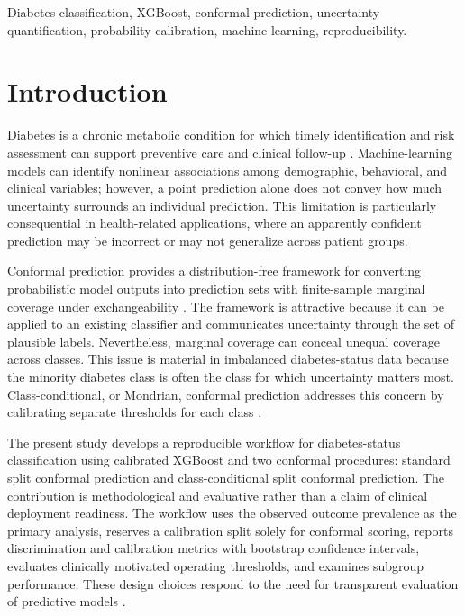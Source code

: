 \documentclass{ieeeaccess}
\begin{document}
\begin{keywords}
Diabetes classification, XGBoost, conformal prediction, uncertainty quantification, probability calibration, machine learning, reproducibility.
\end{keywords}

\titlepgskip=-15pt

\maketitle

\section{Introduction}
Diabetes is a chronic metabolic condition for which timely identification and risk assessment can support preventive care and clinical follow-up \cite{who2023diabetes}. Machine-learning models can identify nonlinear associations among demographic, behavioral, and clinical variables; however, a point prediction alone does not convey how much uncertainty surrounds an individual prediction. This limitation is particularly consequential in health-related applications, where an apparently confident prediction may be incorrect or may not generalize across patient groups.

Conformal prediction provides a distribution-free framework for converting probabilistic model outputs into prediction sets with finite-sample marginal coverage under exchangeability \cite{shafer2008tutorial,vovk2005algorithmic,angelopoulos2023conformal}. The framework is attractive because it can be applied to an existing classifier and communicates uncertainty through the set of plausible labels. Nevertheless, marginal coverage can conceal unequal coverage across classes. This issue is material in imbalanced diabetes-status data because the minority diabetes class is often the class for which uncertainty matters most. Class-conditional, or Mondrian, conformal prediction addresses this concern by calibrating separate thresholds for each class \cite{vovk2005algorithmic,angelopoulos2023conformal}.

The present study develops a reproducible workflow for diabetes-status classification using calibrated XGBoost \cite{chen2016xgboost} and two conformal procedures: standard split conformal prediction and class-conditional split conformal prediction. The contribution is methodological and evaluative rather than a claim of clinical deployment readiness. The workflow uses the observed outcome prevalence as the primary analysis, reserves a calibration split solely for conformal scoring, reports discrimination and calibration metrics with bootstrap confidence intervals, evaluates clinically motivated operating thresholds, and examines subgroup performance. These design choices respond to the need for transparent evaluation of predictive models \cite{collins2015tripod,vancalster2019calibration}.
\end{document}
